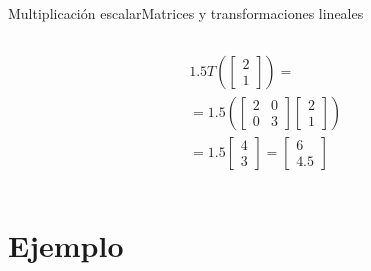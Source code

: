 \documentclass[spanish, c]{beamer}
\begin{document}
\begin{frame}{Multiplicación escalar}{Matrices y transformaciones lineales}
\begin{columns}
        \begin{column}{0.5\textwidth}
            \begin{align*}
            & 1.5 T \left(
            \begin{bmatrix}
                2 \\ 1
            \end{bmatrix}
                \right) = \\[2ex]
            & = 1.5 \left(
                \begin{bmatrix}
                    2 & 0 \\
                    0 & 3
                \end{bmatrix}
                \begin{bmatrix}
                    2 \\ 1
                \end{bmatrix} \right ) \\
            & = 1.5 \begin{bmatrix}
                4 \\ 3
            \end{bmatrix} =
            \begin{bmatrix}
                6 \\ 4.5
            \end{bmatrix}
            \end{align*}
        \end{column}
    \end{columns}
\end{frame}

\section{Ejemplo}
\end{document}
